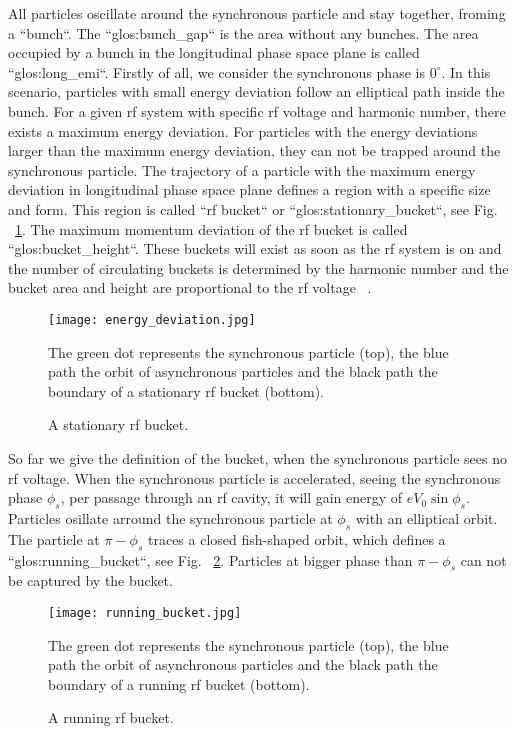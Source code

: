 All particles oscillate around the synchronous particle and stay together, froming a ``bunch``. The ``\gls{glos:bunch_gap}`` is the area without any bunches. The area occupied by a bunch in the longitudinal phase space plane is called ``\gls{glos:long_emi}``. Firstly of all, we consider the synchronous phase is $0^\circ$. In this scenario, particles with small energy deviation follow an elliptical path inside the bunch. For a given rf system with specific rf voltage and harmonic number, there exists a maximum energy deviation. For particles with the energy deviations larger than the maximum energy deviation, they can not be trapped around the synchronous particle. The trajectory of a particle with the maximum energy deviation in longitudinal phase space plane defines a region with a specific size and form. This region is called ``rf bucket`` or ``\gls{glos:stationary_bucket}``, see Fig. ~\ref{energy_deviation}. The maximum momentum deviation of the rf bucket is called ``\gls{glos:bucket_height}``. These buckets will exist as soon as the rf system is on and the number of circulating buckets is determined by the harmonic number and the bucket area and height are proportional to the rf voltage ~\cite{lee_accelerator_2011}. 
\begin{figure}[!htb]
   \centering   
   \texttt{[image: energy\_deviation.jpg]}
   \caption{A stationary rf bucket.}{The green dot represents the synchronous particle (top), the blue path the orbit of asynchronous particles and the black path the boundary of a stationary rf bucket (bottom).}
   \label{energy_deviation}
\end{figure} 

So far we give the definition of the bucket, when the synchronous particle sees no rf voltage. When the synchronous particle is accelerated, seeing the synchronous phase $\phi_{\mathit{s}}$, per passage through an rf cavity, it will gain energy of $eV_0\sin\phi_{\mathit{s}}$. %
Particles osillate arround the synchronous particle at $\phi_{\mathit{s}}$ with an elliptical orbit. The particle at $\pi-\phi_{\mathit{s}}$ traces a closed fish-shaped orbit, which defines a ``\gls{glos:running_bucket}``, see Fig. ~\ref{running_bucket}. Particles at bigger phase than $\pi-\phi_{\mathit{s}}$ can not be captured by the bucket.
\begin{figure}[!htb]
   \centering   
   \texttt{[image: running\_bucket.jpg]}
   \caption{A running rf bucket.}{The green dot represents the synchronous particle (top), the blue path the orbit of asynchronous particles and the black path the boundary of a running rf bucket (bottom).}
   \label{running_bucket}
\end{figure} 

